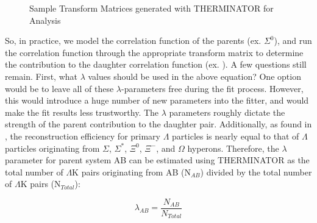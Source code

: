 \documentclass[../AnalysisNoteJBuxton.tex]{subfiles}
\begin{document}
\begin{figure}[h!]
  \caption[Sample Transform Matrices for \ALamKchP Analysis]{Sample Transform Matrices generated with THERMINATOR for \ALamKchP Analysis}
  \label{fig:TransformMatricesALamKchP}
\end{figure}


So, in practice, we model the correlation function of the parents (ex. $\Sigma^{0}$\KchP), and run the correlation function through the appropriate transform matrix to determine the contribution to the daughter correlation function (ex. \LamKchP).  A few questions still remain.  First, what $\lambda$ values should be used in the above equation?  One option would be to leave all of these $\lambda$-parameters free during the fit process.  However, this would introduce a huge number of new parameters into the fitter, and would make the fit results less trustworthy.  The $\lambda$ parameters roughly dictate the strength of the parent contribution to the daughter pair.  Additionally, as found in \cite{Salzwedel:2241303}, the reconstruction efficiency for primary $\Lambda$ particles is nearly equal to that of $\Lambda$ particles originating from $\Sigma$, $\Sigma^{*}$, $\Xi^{0}$, $\Xi^{-}$, and $\Omega$ hyperons.  Therefore, the $\lambda$ parameter for parent system AB can be estimated using THERMINATOR as the total number of $\Lambda$K pairs originating from AB (N$_{AB}$) divided by the total number of $\Lambda$K pairs (N$_{Total}$):

\begin{equation}
\lambda_{AB} = \frac{N_{AB}}{N_{Total}}
\end{equation}
\end{document}
